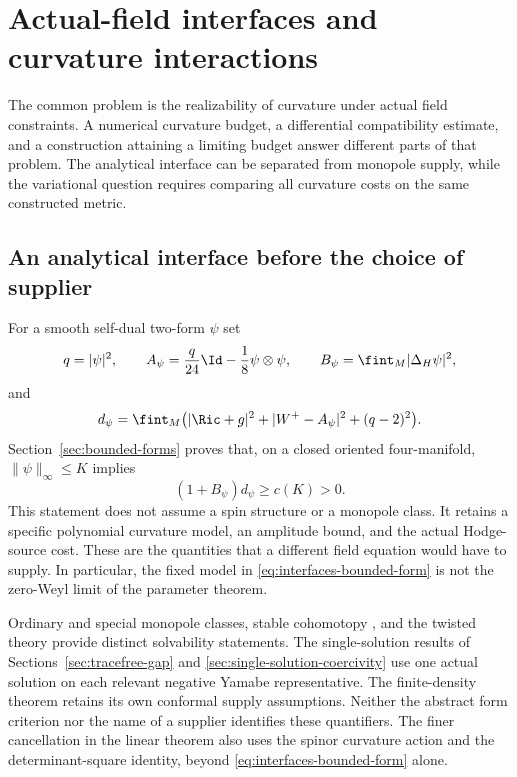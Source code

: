 \section{Actual-field interfaces and curvature interactions}
\label{sec:field-interfaces}

The common problem is the realizability of curvature under actual field
constraints. A numerical curvature budget, a differential compatibility
estimate, and a construction attaining a limiting budget answer different
parts of that problem. The analytical interface can be separated from
monopole supply, while the variational question requires comparing all
curvature costs on the same constructed metric.

\subsection{An analytical interface before the choice of supplier}
For a smooth self-dual two-form $\psi$ set
\[
 q=|\psi|^2,\qquad
 A_\psi=\frac{q}{24}\Id-\frac18\psi\otimes\psi,
 \qquad B_\psi=\fint_M|\Delta_H\psi|^2,
\]
and
\[
 d_\psi=\fint_M\bigl(
 |\Ric+g|^2+|W^+-A_\psi|^2+(q-2)^2\bigr).
\]
Section~\ref{sec:bounded-forms} proves that, on a closed oriented
four-manifold, $\|\psi\|_\infty\le K$ implies
\begin{equation}\label{eq:interfaces-bounded-form}
 (1+B_\psi)d_\psi\ge c(K)>0.
\end{equation}
This statement does not assume a spin structure or a monopole class.
It retains a specific polynomial curvature model, an amplitude bound,
and the actual Hodge-source cost. These are the quantities that a
different field equation would have to supply. In particular, the
fixed model in \eqref{eq:interfaces-bounded-form} is not the zero-Weyl
limit of the parameter theorem.

Ordinary and special monopole classes, stable cohomotopy
\cite{BauerFuruta2004I,Bauer2004II}, and the twisted theory
\cite{IMN2016} provide distinct solvability statements.
The single-solution results of Sections~\ref{sec:tracefree-gap} and
\ref{sec:single-solution-coercivity} use one actual solution on each
relevant negative Yamabe representative. The finite-density theorem
retains its own conformal supply assumptions. Neither the abstract
form criterion nor the name of a supplier identifies these quantifiers.
The finer cancellation in the linear theorem also uses the spinor
curvature action and the determinant-square identity, beyond
\eqref{eq:interfaces-bounded-form} alone.

